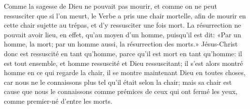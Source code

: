 Comme la sagesse de Dieu ne pouvait pas mourir,
	et comme on ne peut ressusciter que si l’on meurt,
	le Verbe a pris une chair mortelle,
	afin de mourir en cette chair sujette au trépas,
	et d’y ressusciter une fois mort.
La résurrection ne pouvait avoir lieu, en effet, qu’au moyen d’un homme,
	puisqu’il est dit: «Par un homme, la mort;
	par un homme aussi, la résurrection des morts.»
Jésus-Christ donc est ressuscité en tant qu’homme,
	parce qu’il est mort en tant qu’homme:
	il est tout ensemble, et homme ressuscité et Dieu ressuscitant;
	il s’est alors montré homme en ce qui regarde la chair,
	il se montre maintenant Dieu en toutes choses,
	car nous ne le connaissons plus tel qu’il était selon la chair;
	mais sa chair est cause que nous le connaissons
	comme prémices de ceux qui ont fermé les yeux,
	comme premier-né d’entre les morts.
